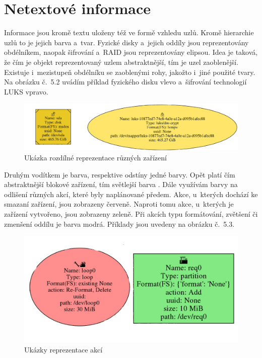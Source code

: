 \documentclass[color,table,oneside,nolot,nolof]{fithesis}
\begin{document}
\section{Netextové informace}
  Informace jsou kromě textu uloženy též ve formě vzhledu uzlů. Kromě hierarchie uzlů to je jejich barva a~tvar. Fyzické disky a~jejich oddíly jsou
	reprezentovány obdélníkem, naopak šifrování a~RAID jsou reprezentovány
	elipsou. Idea je taková, že čím je objekt reprezentovaný uzlem abstraktnější, tím je uzel zaoblenější. Existuje i~mezistupeň obdélníku se zaoblenými
	rohy, jakožto i~jiné použité tvary. Na obrázku č.~5.2 uvádím příklad fyzického disku vlevo a~šifrování technologií LUKS vpravo.
\begin{figure}[h!]
	\label{fig:Rozdíly zařízení}
	\caption{Ukázka rozdílné reprezentace různých zařízení}
	\centering
	\includegraphics[width=.9\columnwidth]{pictures/disk_and_luks.jpg}
\end{figure}

	Druhým vodítkem je barva, respektive odstíny jedné barvy. Opět platí čím abstraktnější blokové zařízení, tím světlejší barva . Dále využívám
	barvy na odlišení různých akcí, které byly naplánované předem. Akce, u~kterých dochází ke smazaní zařízení, jsou zobrazeny červeně. Naproti tomu akce,
	u~kterých je zařízení vytvořeno, jsou zobrazeny zeleně. Při akcích typu formátování, zvětšení či zmenšení oddílu je barva modrá. Příklady jsou uvedeny na obrázku č.~5.3.

\begin{figure}
	\label{fig:Reprezentace naplánované akce}
	\caption{Ukázky reprezentace akcí}
	\centering
	\includegraphics[width=.9\columnwidth]{pictures/actions.jpg}
\end{figure}
  
\end{document}
